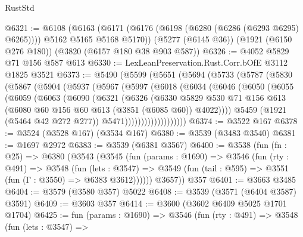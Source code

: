 \begin{lexlean}{RustStd}
\begin{coremodule}
@6321 := @6108
    (@6163 (@6171 (@6176 (@6198 (@6280 (@6286 (@6293 @6295) @6265)))) @5162 @5165 @5168 @5170))
    (@5277 (@6145 @36))
    (@1921 (@6150 @276 @180))
    (@3820 (@6157 @180 @38 @903 @587))
@6326 := @4052 @5829 @71 @156 @587 @613
@6330 := LexLeanPreservation.Rust.Corr.bOfE @3112 @1825 @3521
@6373 := @5490
    (@5599
      (@5651
        (@5694
          (@5733
            (@5787
              (@5830
                (@5867
                  (@5904
                    (@5937
                      (@5967
                        (@5997
                          (@6018
                            (@6034
                              (@6046
                                (@6050
                                  (@6055
                                    (@6059
                                      (@6063
                                        (@6090
                                          (@6321
                                            (@6326
                                              (@6330
                                                @5829
                                                @530
                                                @71
                                                @156
                                                @613
                                                (@6080
                                                  @60
                                                  @156
                                                  @60
                                                  @613
                                                  (@3851 (@6085 @60))
                                                  @4022))))
                                          @5459
                                          (@1921 (@5464 @42 @272 @277))
                                          @5471)))))))))))))))))))
@6374 := @3522 @167
@6378 := @3524 (@3528 @167) (@3534 @167)
@6380 := @3539 (@3483 @3540)
@6381 := @1697 @2972
@6383 := @3539 (@6381 @3567)
@6400 := @3538
    (fun (fn : @25) =>
    @6380
      (@3543
        (@3545
          (fun (params : @1690) =>
          @3546
            (fun (rty : @491) =>
            @3548
              (fun (lets : @3547) =>
              @3549 (fun (tail : @595) => @3551 (fun (Γ : @3550) => @6383 @3612))))))
        @3657))
    @357
@6401 := @3663 @3485
@6404 := @3579 (@3580 @357) @5022
@6408 := @3539 (@3571 (@6404 @3587) @3591)
@6409 := @3603 @357
@6414 := @3600 (@3602 @6409 @5025 @1701 @1704)
@6425 := fun (params : @1690) =>
  @3546
    (fun (rty : @491) =>
    @3548
      (fun (lets : @3547) =>

\end{coremodule}
\end{lexlean}
